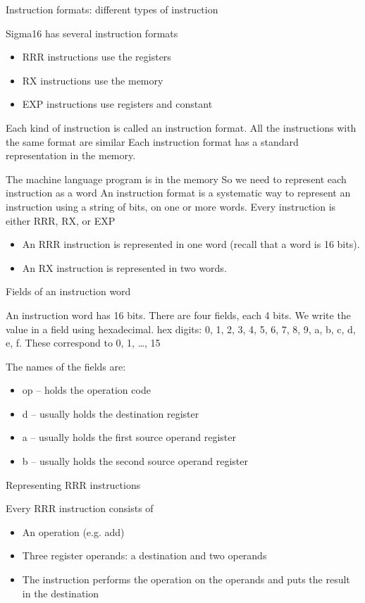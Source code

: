 \documentclass[11pt]{article}
\begin{document}
\begin{itemize}
Instruction formats: different types of instruction

Sigma16 has several instruction formats

\begin{itemize}
\item \alert{RRR} instructions use the \alert{registers}
\item \alert{RX} instructions use the \alert{memory}
\item \alert{EXP} instructions use \alert{registers and constant}
\end{itemize}

Each kind of instruction is called an instruction format.  All the
instructions with the same format are similar Each instruction format
has a standard representation in the memory.

The machine language program is in the memory So we need to represent
each instruction as a word An instruction format is a systematic way
to represent an instruction using a string of bits, on one or more
words.  Every instruction is either RRR, RX, or EXP

\begin{itemize}
\item An RRR instruction is represented in one word (recall that a word is
16 bits).
\item An RX instruction is represented in two words.
\end{itemize}

Fields of an instruction word

An instruction word has 16 bits.  There are four fields, each 4 bits.
We write the value in a field using hexadecimal.  hex digits: 0, 1, 2,
3, 4, 5, 6, 7, 8, 9, a, b, c, d, e, f.  These correspond to 0, 1, \ldots{},
15

The names of the fields are:

\begin{itemize}
\item op -- holds the operation code
\item d  -- usually holds the destination register
\item a  -- usually holds the first source operand register
\item b -- usually holds the second source operand register
\end{itemize}

Representing RRR instructions

Every RRR instruction consists of

\begin{itemize}
\item An operation (e.g. add)
\item Three register operands: a destination and two operands
\item The instruction performs the operation on the operands and
puts the result in the destination
\end{itemize}


\end{itemize}
\end{document}
